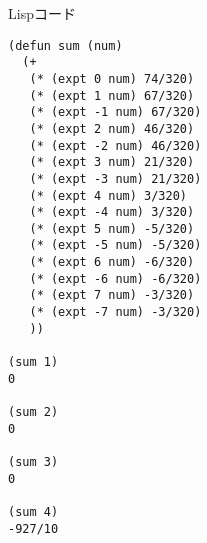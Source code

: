 \documentclass[12pt,b5paper]{ltjsarticle}
\begin{document}
%


Lispコード
\begin{lstlisting}
(defun sum (num)
  (+
   (* (expt 0 num) 74/320)
   (* (expt 1 num) 67/320)
   (* (expt -1 num) 67/320)
   (* (expt 2 num) 46/320)
   (* (expt -2 num) 46/320)
   (* (expt 3 num) 21/320)
   (* (expt -3 num) 21/320)
   (* (expt 4 num) 3/320)
   (* (expt -4 num) 3/320)
   (* (expt 5 num) -5/320)
   (* (expt -5 num) -5/320)
   (* (expt 6 num) -6/320)
   (* (expt -6 num) -6/320)
   (* (expt 7 num) -3/320)
   (* (expt -7 num) -3/320)
   ))

(sum 1)
0

(sum 2)
0

(sum 3)
0

(sum 4)
-927/10
\end{lstlisting}


\hrulefill
\end{document}
